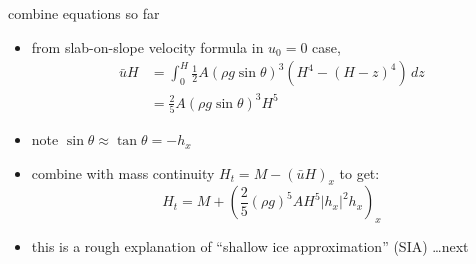 \begin{frame}{combine equations so far}

\begin{itemize}
\item from slab-on-slope velocity formula in $u_0=0$ case,
\begin{align*}
\bar u H &= \int_0^H \frac{1}{2} A (\rho g \sin\theta)^3  \left(H^4 - (H-z)^4\right)\,dz \\
	&= \frac{2}{5} A (\rho g \sin\theta)^3 H^5
\end{align*}
\item note $\sin \theta \approx \tan\theta = - h_x$
\item combine with mass continuity $H_t = M - \left(\bar u H\right)_x$ to get:
  $$H_t = M + \left(\frac{2}{5} (\rho g)^5 A H^5 |h_x|^2 h_x\right)_x$$

\medskip
\item this is a rough explanation of ``shallow ice approximation'' (SIA) \dots next
\end{itemize}
\end{frame}

